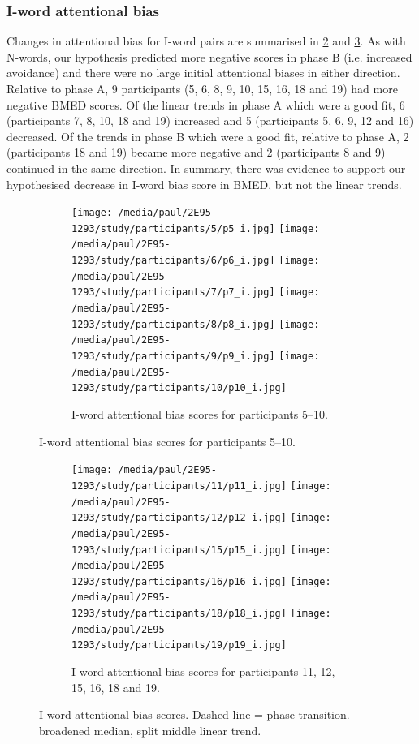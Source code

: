 \documentclass[man,floatsintext,a4paper,biblatex]{apa6}\usepackage[]{graphicx}\usepackage[]{color}
\newcommand\strokeA{\tikz[baseline=-.5ex]{ \draw[black,thick,align=center] (0,0) -- (2ex,0); }}
\newcommand\strokeB{\tikz[baseline=-.5ex]{ \draw[red,thick,dotted] (0,0) -- (2ex,0); }}
\begin{document}
\subsubsection{I-word attentional bias}

Changes in attentional bias for I-word pairs are summarised in
\cref{fig:va-i-a} and \cref{fig:va-i-b}. As with N-words, our hypothesis
predicted more negative scores in phase B (i.e. increased avoidance)
and there were no large initial attentional biases in either direction.
Relative to phase A, 9 participants (5, 6, 8, 9, 10, 15, 16, 18 and 19)
had more negative BMED scores. Of the linear trends in phase A which
were a good fit, 6 (participants 7, 8, 10, 18 and 19) increased and 5
(participants 5, 6, 9, 12 and 16) decreased. Of the trends in phase B
which were a good fit, relative to phase A, 2 (participants 18 and 19)
became more negative and 2 (participants 8 and 9) continued in the same
direction. In summary, there was evidence to support our hypothesised
decrease in I-word bias score in BMED, but not the linear trends.

\begin{figure}[!htbp]
  \begin{subfigure}[!htbp]{\textwidth}
    \texttt{[image: /media/paul/2E95-1293/study/participants/5/p5\_i.jpg]}
    \texttt{[image: /media/paul/2E95-1293/study/participants/6/p6\_i.jpg]}
    \texttt{[image: /media/paul/2E95-1293/study/participants/7/p7\_i.jpg]}
    \texttt{[image: /media/paul/2E95-1293/study/participants/8/p8\_i.jpg]}
    \texttt{[image: /media/paul/2E95-1293/study/participants/9/p9\_i.jpg]}
    \texttt{[image: /media/paul/2E95-1293/study/participants/10/p10\_i.jpg]}
    \caption{I-word attentional bias scores for participants 5--10.}
    \label{fig:va-i-a}
  \end{subfigure}
\end{figure}

\begin{figure}
\ContinuedFloat
  \begin{subfigure}[!htbp]{\textwidth}
    \texttt{[image: /media/paul/2E95-1293/study/participants/11/p11\_i.jpg]}
    \texttt{[image: /media/paul/2E95-1293/study/participants/12/p12\_i.jpg]}
    \texttt{[image: /media/paul/2E95-1293/study/participants/15/p15\_i.jpg]}
    \texttt{[image: /media/paul/2E95-1293/study/participants/16/p16\_i.jpg]}
    \texttt{[image: /media/paul/2E95-1293/study/participants/18/p18\_i.jpg]}
    \texttt{[image: /media/paul/2E95-1293/study/participants/19/p19\_i.jpg]}
    \caption{I-word attentional bias scores for participants 11, 12, 15, 16, 18 and 19.}
    \label{fig:va-i-b}
  \end{subfigure}
\caption{I-word attentional bias scores. Dashed line = phase transition. \protect\strokeA{} broadened
median, \protect\strokeB{} split middle linear trend.}
\label{fig:va-i}
\end{figure}
\clearpage
\end{document}
